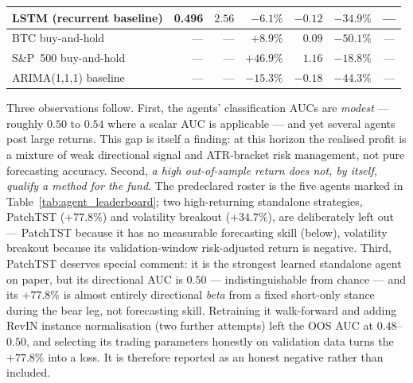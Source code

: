 \begin{table}[h!]
{\begin{tabular}{lrrrrrc}
        LSTM (recurrent baseline)           & 0.496 & $2.56$  & $-6.1\%$   & $-0.12$ & $-34.9\%$ & --- \\
        \midrule
        BTC buy-and-hold                    & ---   & ---     & $+8.9\%$   & $0.09$  & $-50.1\%$ & --- \\
        S\&P~500 buy-and-hold               & ---   & ---     & $+46.9\%$  & $1.16$  & $-18.8\%$ & --- \\
        ARIMA(1,1,1) baseline               & ---   & ---     & $-15.3\%$  & $-0.18$ & $-44.3\%$ & --- \\
        \bottomrule
    \end{tabular}}
\end{table}


Three observations follow. First, the agents' classification AUCs are \textit{modest} --- roughly $0.50$ to $0.54$ where a scalar AUC is applicable --- and yet several agents post large returns. This gap is itself a finding: at this horizon the realised profit is a mixture of weak directional signal and ATR-bracket risk management, not pure forecasting accuracy. Second, \textit{a high out-of-sample return does not, by itself, qualify a method for the fund}. The predeclared roster is the five agents marked in Table~\ref{tab:agent_leaderboard}; two high-returning standalone strategies, PatchTST ($+77.8\%$) and volatility breakout ($+34.7\%$), are deliberately left out --- PatchTST because it has no measurable forecasting skill (below), volatility breakout because its validation-window risk-adjusted return is negative. Third, PatchTST deserves special comment: it is the strongest learned standalone agent on paper, but its directional AUC is $0.50$ --- indistinguishable from chance --- and its $+77.8\%$ is almost entirely directional \textit{beta} from a fixed short-only stance during the bear leg, not forecasting skill. Retraining it walk-forward and adding RevIN instance normalisation (two further attempts) left the OOS AUC at $0.48$--$0.50$, and selecting its trading parameters honestly on validation data turns the $+77.8\%$ into a loss. It is therefore reported as an honest negative rather than included.

